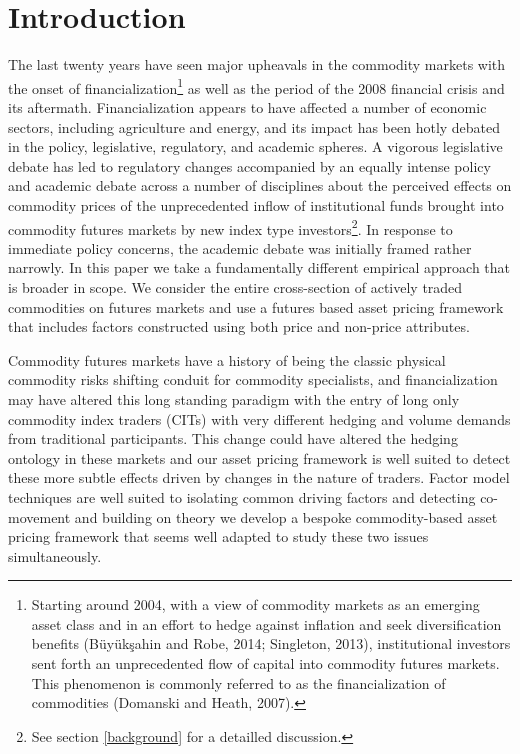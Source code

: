 \documentclass[]{elsarticle} %
\begin{document}
\newpage

\hypertarget{introduction}{%
\section{Introduction}\label{introduction}}

The last twenty years have seen major upheavals in the commodity markets
with the onset of financialization\footnote{Starting around 2004, with a
  view of commodity markets as an emerging asset class and in an effort
  to hedge against inflation and seek diversification benefits
  (Büyükşahin and Robe, 2014; Singleton, 2013), institutional investors
  sent forth an unprecedented flow of capital into commodity futures
  markets. This phenomenon is commonly referred to as the
  financialization of commodities (Domanski and Heath, 2007).} as well
as the period of the 2008 financial crisis and its aftermath.
Financialization appears to have affected a number of economic sectors,
including agriculture and energy, and its impact has been hotly debated
in the policy, legislative, regulatory, and academic spheres. A vigorous
legislative debate has led to regulatory changes accompanied by an
equally intense policy and academic debate across a number of
disciplines about the perceived effects on commodity prices of the
unprecedented inflow of institutional funds brought into commodity
futures markets by new index type investors\footnote{See section
  \ref{background} for a detailled discussion.}. In response to
immediate policy concerns, the academic debate was initially framed
rather narrowly. In this paper we take a fundamentally different
empirical approach that is broader in scope. We consider the entire
cross-section of actively traded commodities on futures markets and use
a futures based asset pricing framework that includes factors
constructed using both price and non-price attributes.

Commodity futures markets have a history of being the classic physical
commodity risks shifting conduit for commodity specialists, and
financialization may have altered this long standing paradigm with the
entry of long only commodity index traders (CITs) with very different
hedging and volume demands from traditional participants. This change
could have altered the hedging ontology in these markets and our asset
pricing framework is well suited to detect these more subtle effects
driven by changes in the nature of traders. Factor model techniques are
well suited to isolating common driving factors and detecting
co-movement and building on theory we develop a bespoke commodity-based
asset pricing framework that seems well adapted to study these two
issues simultaneously.
\end{document}
